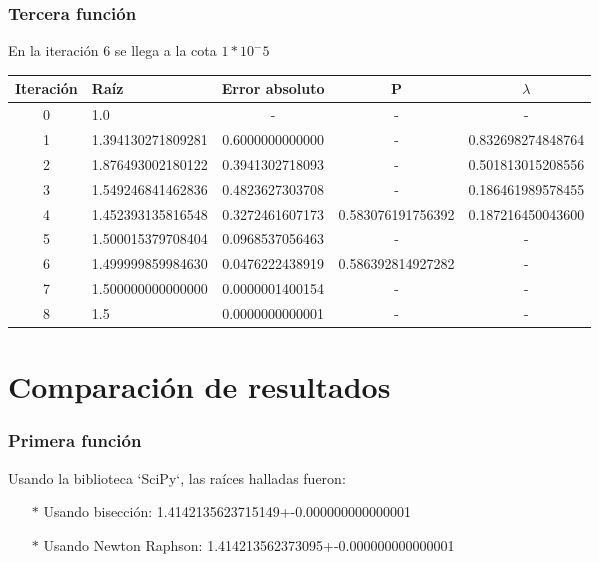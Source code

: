 \documentclass[titlepage,a4paper]{article}
\begin{document}
\subsubsection{Tercera función}\label{sec:sec3}
En la iteración 6 se llega a la cota $1*10^-5$
\begin{center}
\begin{tabular}{| c | l | c | c | c |}
    \hline
    Iteración & Raíz & Error absoluto & P & $\lambda$ \\ \hline
    0      & 1.0  &  -  &  -  &  - \\
    1      & 1.394130271809281  &  0.6000000000000  &  -  &  0.832698274848764 \\
    2      & 1.876493002180122  &  0.3941302718093  &  -  &  0.501813015208556 \\
    3      & 1.549246841462836  &  0.4823627303708  &  -  &  0.186461989578455 \\
    4      & 1.452393135816548  &  0.3272461607173  &  0.583076191756392  &  0.187216450043600 \\
    5      & 1.500015379708404  &  0.0968537056463  &  -  &  - \\
    6      & 1.499999859984630  &  0.0476222438919  &  0.586392814927282  &  - \\
    7      & 1.500000000000000  &  0.0000001400154  & - & - \\
    8      & 1.5  &  0.0000000000001  & - & - \\
    \hline
\end{tabular}
\end{center}

\newpage

\section{Comparación de resultados}\label{sec:comparacion_resultados}
\subsubsection{Primera función}\label{sec:CR1}

Usando la biblioteca `SciPy`, las raíces halladas fueron:
\begin{itemize}
    \item[$*$]Usando bisección:  1.4142135623715149+-0.000000000000001
    \item[$*$]Usando Newton Raphson:  1.414213562373095+-0.000000000000001
\end{itemize}
\end{document}
